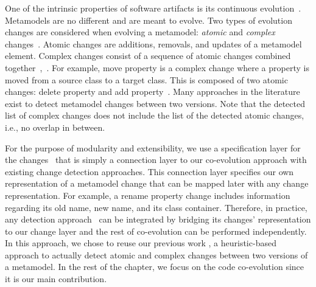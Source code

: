 One of the intrinsic properties of software artifacts is its continuous evolution~\cite{mens2008introduction}. Metamodels are no different and are meant to evolve. 
Two types of evolution changes are considered when evolving a metamodel: \emph{atomic} and \emph{complex} changes~\cite{Herrmannsdoerfer2011}. 
Atomic changes are additions, removals, and updates of a metamodel element. Complex changes consist of a sequence of atomic changes combined together~\cite{vermolen_reconstructing_2012},~\cite{khelladi2015detecting}. For example, move property is a complex change where a property is moved from a source class to a target class. This is composed of two atomic changes: delete property and add property~\cite{Herrmannsdoerfer2011}. 
Many approaches in the literature~\cite{Alter2015, williams2012searching,cicchetti_managing_2009,langer_posteriori_2013,vermolen_reconstructing_2012,Khelladi2016,bettini2022executable} exist to detect metamodel changes between two versions. Note that the detected list of complex changes does not include the list of the detected atomic changes, i.e., no overlap in between. 

For the purpose of modularity and extensibility, we use a specification layer for the changes~{\small{}} that is simply a connection layer to our co-evolution approach with existing change detection approaches. This connection layer specifies our own representation of a metamodel change that can be mapped later with any change representation.  
For example, a rename property change includes information regarding its old name, new name, and its class container. Therefore, in practice, any detection approach~\cite{Alter2015, williams2012searching,cicchetti_managing_2009,langer_posteriori_2013,vermolen_reconstructing_2012,Khelladi2016,bettini2022executable} can be integrated by bridging its changes' representation to our change layer and the rest of co-evolution can be performed independently.
In this approach, we chose to reuse our previous work \cite{Khelladi2016}, a heuristic-based approach to actually detect atomic and complex changes between two versions of a metamodel.
In the rest of the chapter, we focus on the code co-evolution since it is our main contribution. 

